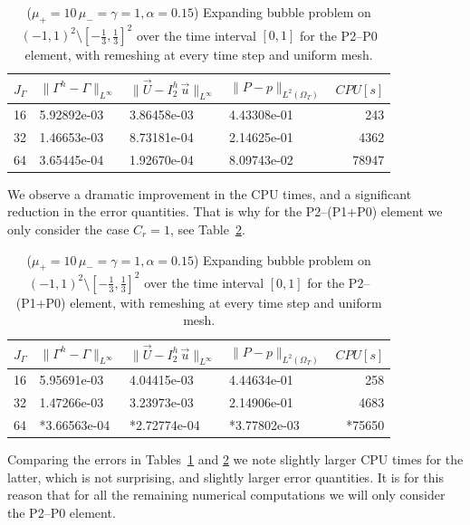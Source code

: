 \documentclass[a4paper,12pt,onecolumn]{article}
\newcommand{\errorXx}{\|\Gamma^h - \Gamma\|_{L^\infty}}
\newcommand{\errorUu}[1]{\|\vec U - I^h_{#1}\,\vec u\|_{L^\infty}}
\newcommand{\LerrorPp}{\|P - p\|_{L^2(\Omega_T)}}
\begin{document}
\begin{table}
\center
\begin{tabular}{llllr}
\hline
$J_\Gamma$ & $\errorXx$ & $\errorUu2$ & $\LerrorPp$ & $CPU[s]$\\
\hline
16 & 5.92892e-03 & 3.86458e-03 & 4.43308e-01 &   243 \\
32 & 1.46653e-03 & 8.73181e-04 & 2.14625e-01 &  4362 \\
64 & 3.65445e-04 & 1.92670e-04 & 8.09743e-02 & 78947 \\
\hline
\end{tabular}
\caption{($\mu_+ = 10\,\mu_- = \gamma = 1,\alpha = 0.15$) Expanding bubble 
problem on $(-1,1)^2\setminus[-\frac{1}{3},\frac{1}{3}]^2$ over the time 
interval $[0,1]$ for the P2--P0 element, with remeshing at every time step and 
uniform mesh.}
\label{tab:expandingbubble2Dp2p0remesh}
\end{table}
We observe a dramatic improvement in the CPU times, and a significant reduction
in the error quantities. That is why for the P2--(P1+P0) element we only
consider the case $C_r = 1$, see 
Table~\ref{tab:expandingbubble2Dp2p1p0remesh}.
\begin{table}
 \center
\begin{tabular}{llllr}
\hline
$J_\Gamma$ & $\errorXx$ & $\errorUu2$ & $\LerrorPp$ & $CPU[s]$ \\
\hline
16 & 5.95691e-03 & 4.04415e-03 & 4.44634e-01 &  258 \\
32 & 1.47266e-03 & 3.23973e-03 & 2.14906e-01 & 4683 \\
64 & *3.66563e-04 & *2.72774e-04 & *3.77802e-03 & *75650 \\
\hline
\end{tabular}
\caption{($\mu_+ = 10\,\mu_- = \gamma = 1,\alpha = 0.15$) Expanding bubble 
problem on $(-1,1)^2\setminus[-\frac{1}{3},\frac{1}{3}]^2$ over the time 
interval $[0,1]$ for the P2--(P1+P0) element, with remeshing at every time step 
and uniform mesh.}
\label{tab:expandingbubble2Dp2p1p0remesh}
\end{table}
Comparing the errors in Tables~\ref{tab:expandingbubble2Dp2p0remesh} and 
\ref{tab:expandingbubble2Dp2p1p0remesh} we note slightly larger CPU times
for the latter, which is not surprising, and slightly larger error quantities.
It is for this reason that for all the remaining numerical computations we will
only consider the P2--P0 element.
\end{document}
